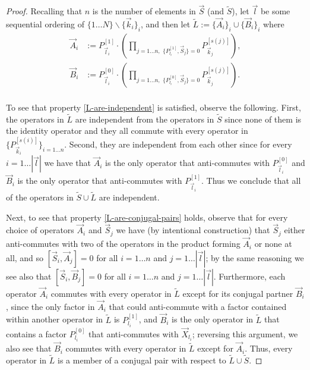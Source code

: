 \documentclass[12pt]{amsbook}
\theoremstyle{plain}
\theoremstyle{definition}
\theoremstyle{remark}
\newcommand{\lst}{\vec}
\newcommand{\set}{\tilde}
\newcommand{\paren}[1]{\left(#1\right)}
\begin{document}
\begin{proof}
Recalling that $n$ is the number of elements in $\lst S$ (and $\set S$), let $\lst l$ be some sequential ordering of $\{1 \dots N\}\backslash\{\vec k_i\}_i$, and then let $\set L:=\{\lst A_i\}_i\cup\{\lst B_i\}_i$ where
$$
\begin{aligned}
\lst A_i &:= P_{\lst l_i}^{[1]}\cdot \paren{\prod_{j=1\dots n,\,\,\{P_{l_i}^{[1]},\lst S_j\}=0} P_{\lst k_j}^{[s(j)]}},\\
\lst B_i &:= P_{\lst l_i}^{[0]}\cdot \paren{\prod_{j=1\dots n,\,\,\{P_{l_i}^{[0]},\lst S_j\}=0} P_{\lst k_j}^{[s(j)]}}.\\
\end{aligned}
$$

To see that property \ref{L-are-independent} is satisfied, observe the following.  First, the operators in $\set L$ are independent from the operators in $\set S$ since none of them is the identity operator and they all commute with every operator in $\{P_{\lst k_i}^{[s(i)]}\}_{i=1 \dots n}$.  Second, they are independent from each other since for every $i=1 \dots |\lst l|$ we have that $\vec A_i$ is the only operator that anti-commutes with $P_{\lst l_i}^{[0]}$ and $\lst B_i$ is the only operator that anti-commutes with $P_{\lst l_i}^{[1]}$.  Thus we conclude that all of the operators in $\set S\cup\set L$ are independent.

Next, to see that property \ref{L-are-conjugal-pairs} holds, observe that for every choice of operators $\lst A_i$ and $\lst S_j$ we have (by intentional construction) that $\lst S_j$ either anti-commutes with two of the operators in the product forming $\lst A_i$ or none at all, and so $[\lst S_i,\lst A_j]=0$ for all $i=1\dots n$ and $j=1\dots |\lst l|$;  by the same reasoning we see also that $[\lst S_i,\lst B_j]=0$ for all $i=1\dots n$ and $j=1\dots |\lst l|$.  Furthermore, each operator $\lst A_i$ commutes with every operator in $\set L$ except for its conjugal partner $\lst B_i$, since the only factor in $\lst A_i$ that could anti-commute with a factor contained within another operator in $\set L$ is $P_{l_i}^{[1]}$, and $\lst B_i$ is the only operator in $\set L$ that contains a factor $P_{l_i}^{[0]}$ that anti-commutes with $\lst X_{l_i}$;  reversing this argument, we also see that $\lst B_i$ commutes with every operator in $\set L$ except for $\lst A_i$.  Thus, every operator in $\set L$ is a member of a conjugal pair with respect to $\set L\cup\set S$.


\end{proof}
\end{document}
